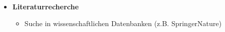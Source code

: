 \label{sec:meth}
\begin{itemize}
	\item \textbf{Literaturrecherche}
	\begin{itemize}
		\item Suche in wissenschaftlichen Datenbanken (z.B. SpringerNature)
	\end{itemize}
\end{itemize}